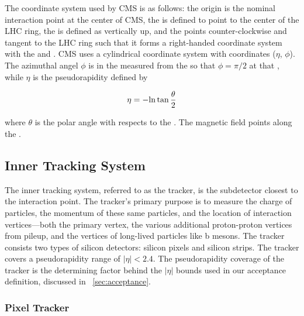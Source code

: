 The coordinate system used by CMS is as follows: the origin is the nominal
interaction point at the center of CMS, the \xaxis is defined to point to the
center of the LHC ring, the \yaxis is defined as vertically up, and the \zaxis
points counter-clockwise and tangent to the LHC ring such that it forms a
right-handed coordinate system with the \xaxis and \yaxis. CMS uses a
cylindrical coordinate system with coordinates ($\eta$, $\phi$). The azimuthal
angel $\phi$ is in the \xyplane measured from the \xaxis so that $\phi=\pi/2$
at that \xaxis, while $\eta$ is the pseudorapidity defined by

\begin{equation}
    \eta = -{\mathrm{ln}} \tan \frac{\theta}{2}
\end{equation}

where $\theta$ is the polar angle with respects to the \zaxis. The magnetic
field points along the \zaxis.

\subsection{Inner Tracking System}

The inner tracking system, referred to as the tracker, is the subdetector
closest to the interaction point. The tracker's primary purpose is to measure
the charge of particles, the momentum of these same particles, and the location
of interaction vertices---both the primary vertex, the various additional
proton-proton vertices from pileup, and the vertices of long-lived particles
like b mesons. The tracker consists two types of silicon detectors: silicon
pixels and silicon strips. The tracker covers a pseudorapidity range of $|\eta|
< 2.4$. The pseudorapidity coverage of the tracker is the determining factor
behind the $|\eta|$ bounds used in our acceptance definition, discussed in
\SEC~\ref{sec:acceptance}.

\subsubsection{Pixel Tracker}

